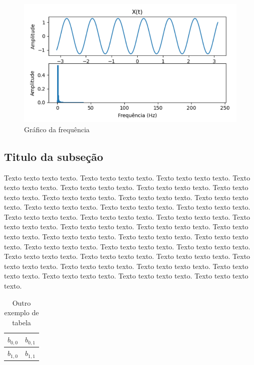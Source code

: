 \documentclass[a4paper, 12pt]{article}
\begin{document}
		\begin{figure}[!htb]
			\centering
			\includegraphics[scale=0.5]{img/fig2.png}
			\caption{Gráfico da frequência}
			\label{grafico-frequencia}
		\end{figure}

	\subsection{Titulo da subseção}

	Texto texto texto texto\cite{labelLivro}. Texto texto texto texto. Texto texto texto texto. Texto texto texto texto.
	Texto texto texto texto. Texto texto texto texto. Texto texto texto texto. Texto texto texto texto.
	Texto texto texto texto. Texto texto texto texto. Texto texto texto texto. Texto texto texto texto.
	Texto texto texto texto. Texto texto texto texto. Texto texto texto texto. Texto texto texto texto.
	Texto texto texto texto. Texto texto texto texto. Texto texto texto texto. Texto texto texto texto.
	Texto texto texto texto. Texto texto texto texto. Texto texto texto texto. Texto texto texto texto.
	Texto texto texto texto. Texto texto texto texto. Texto texto texto texto. Texto texto texto texto.
	Texto texto texto texto. Texto texto texto texto. Texto texto texto texto. Texto texto texto texto.
	Texto texto texto texto. Texto texto texto texto. Texto texto texto texto. Texto texto texto texto\cite{labelArtigo}.
	
	\begin{table}[htb]
		\centering
		\begin{tabular}{|c|c|}
			\hline
			$b_{0, 0}$ & $b_{0, 1}$ \\ \hline
			$b_{1, 0}$ & $b_{1, 1}$ \\ \hline
		\end{tabular}
		\caption{Outro exemplo de tabela}
		\label{ex-tabela-2}
	\end{table}

\newpage


\end{document}

